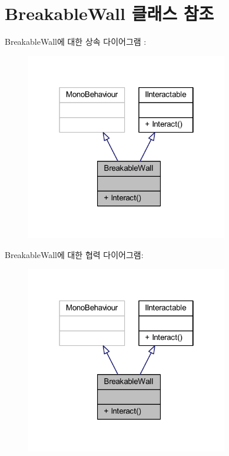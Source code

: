 \hypertarget{class_breakable_wall}{}\section{Breakable\+Wall 클래스 참조}
\label{class_breakable_wall}


Breakable\+Wall에 대한 상속 다이어그램 \+: \nopagebreak
\begin{figure}[H]
\begin{center}
\leavevmode
\includegraphics[width=250pt]{d3/d14/class_breakable_wall__inherit__graph}
\end{center}
\end{figure}


Breakable\+Wall에 대한 협력 다이어그램\+:\nopagebreak
\begin{figure}[H]
\begin{center}
\leavevmode
\includegraphics[width=250pt]{d1/dfa/class_breakable_wall__coll__graph}
\end{center}
\end{figure}
